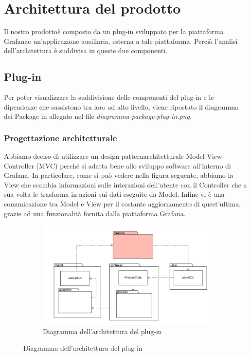 \section{Architettura del prodotto}
Il nostro prodotto\glosp è composto da un plug-in sviluppato per la piattaforma Grafana\glosp e un'applicazione ausiliaria, esterna a tale piattaforma. Perciò l'analisi dell'architettura è suddivisa in queste due componenti.
\subsection{Plug-in}
Per poter visualizzare la suddivisione delle componenti del plug-in e le dipendenze che sussistono tra loro ad alto livello, viene riportato il diagramma dei Package in allegato nel file \textit{diagramma-package-plug-in.png}.
\subsubsection{Progettazione architetturale}
Abbiamo deciso di utilizzare un design pattern\glosp architetturale Model-View-Controller (MVC) perché si adatta bene allo sviluppo software all'interno di Grafana\glo. In particolare, come si può vedere nella figura seguente, abbiamo la View che scambia informazioni sulle interazioni dell'utente con il Controller che a sua volta le trasforma in azioni sui dati eseguite da Model. Infine vi è una comunicazione tra Model e View per il costante aggiornamento di quest'ultima, grazie ad una funzionalità fornita dalla piattaforma Grafana\glo.
\mbox{}
\begin{landscape}
	\begin{figure}
		\begin{figure} [H]
			\includegraphics[width=\linewidth]{./img/Diagrammi/architettura-plug-in.png}
			\caption{Diagramma dell'architettura del plug-in}
		\end{figure}
	\end{figure}
\end{landscape}
